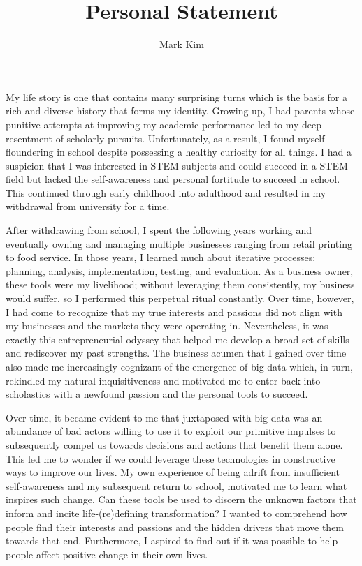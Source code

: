 \documentclass[12pt]{article}
\title{Personal Statement}
\author{Mark Kim}
\begin{document}
\maketitle

My life story is one that contains many surprising turns which is the basis for
a rich and diverse history that forms my identity.  Growing up, I had parents
whose punitive attempts at improving my academic
performance led to my deep resentment of scholarly pursuits.  Unfortunately, as
a result, I found myself floundering in school despite possessing a healthy
curiosity for all things.  I had a suspicion that I was interested in STEM
subjects and could succeed in a STEM field but lacked the self-awareness and
personal fortitude to succeed in school.  This continued through early childhood
into adulthood and resulted in my withdrawal from university for a time.

After withdrawing from school, I spent the following years working and
eventually owning and managing multiple businesses ranging from retail printing
to food service.  In those years, I learned much about iterative processes:
planning, analysis, implementation, testing, and evaluation.  As a business
owner, these tools were my livelihood; without leveraging them
consistently, my business would suffer, so I performed this perpetual ritual constantly.
Over time, however, I had come to recognize that my true interests and
passions did not align with my businesses and the markets they were operating
in. Nevertheless, it was exactly this entrepreneurial odyssey that helped me
develop a broad set of skills and rediscover my past strengths.  The business
acumen that I gained over time also made me increasingly cognizant of the emergence
of big data which, in turn, rekindled my natural inquisitiveness and motivated
me to enter back into scholastics with a newfound passion and the personal tools
to succeed.

Over time, it became evident to me that juxtaposed with big data was an
abundance of bad actors willing to use it to exploit our primitive impulses to
subsequently compel us towards decisions and actions that benefit them alone.
This led me to wonder if we could leverage these technologies in constructive
ways to improve our lives. My own experience of being adrift from insufficient
self-awareness and my subsequent return to school, motivated me to learn what
inspires such change. Can these tools be used to discern the unknown factors
that inform and incite life-(re)defining transformation?  I wanted to comprehend
how people find their interests and passions and the hidden drivers that move
them towards that end.  Furthermore, I aspired to find out if it was possible to
help people affect positive change in their own lives.
\end{document}

